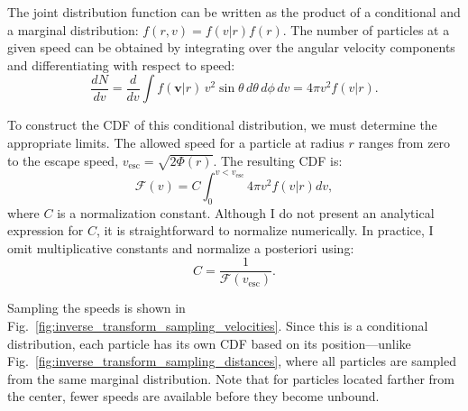             The joint distribution function can be written as the product of a conditional and a marginal distribution: $f(r,v) = f(v|r) f(r)$. The number of particles at a given speed can be obtained by integrating over the angular velocity components and differentiating with respect to speed:
            \begin{equation}
                \frac{dN}{dv} = \frac{d}{dv} \int f(\textbf{v}|r)\, v^2 \sin\theta\, d\theta\, d\phi\, dv = 4\pi v^2 f(v|r).
            \end{equation}

            To construct the CDF of this conditional distribution, we must determine the appropriate limits. The allowed speed for a particle at radius $r$ ranges from zero to the escape speed, $v_{\mathrm{esc}} = \sqrt{2\Phi(r)}$. The resulting CDF is:
            \begin{equation}
                \mathcal{F}(v) = C \int_0^{v < v_\mathrm{esc}} 4\pi v^2 f(v|r) dv,
            \end{equation}
            where $C$ is a normalization constant. Although I do not present an analytical expression for $C$, it is straightforward to normalize numerically. In practice, I omit multiplicative constants and normalize a posteriori using:
            \begin{equation}
                C = \frac{1}{\mathcal{F}(v_\mathrm{esc})}.
            \end{equation}

            Sampling the speeds is shown in Fig.~\ref{fig:inverse_transform_sampling_velocities}. Since this is a conditional distribution, each particle has its own CDF based on its position—unlike Fig.~\ref{fig:inverse_transform_sampling_distances}, where all particles are sampled from the same marginal distribution. Note that for particles located farther from the center, fewer speeds are available before they become unbound.

